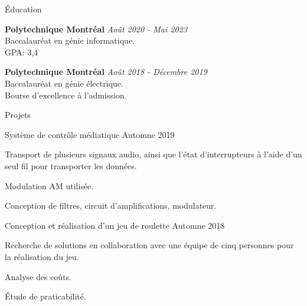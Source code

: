 \documentclass[french,12pt]{resume} %
\begin{document}
	
	
	\begin{rSection}{Éducation}
		
		{\bf Polytechnique Montréal} \hfill {\em Août 2020 - Mai 2023} 
		\\ Baccalauréat en génie informatique.
		\\GPA: 3,4
		
		
		{\bf Polytechnique Montréal} \hfill {\em Août 2018 - Décembre 2019} 
		\\ Baccalauréat en génie électrique.
		\\ \hspace{0.5cm}  Bourse d'excellence à l'admission.
		
	\end{rSection}
	
	
	\begin{rSection}{Projets}
		
		\begin{rSubsection}{Système de contrôle médiatique }{Automne 2019}{}{}
			\item   Transport de plusieurs signaux audio, ainsi que l'état d'interrupteurs à l'aide d'un seul fil pour transporter les données.
			\item   Modulation AM utilisée.
			\item Conception de filtres, circuit d'amplifications, modulateur.
			
		\end{rSubsection}

		
		\begin{rSubsection}{Conception et réalisation d’un jeu de roulette }{Automne 2018}{}{}
			\item  Recherche de solutions en collaboration avec une équipe de cinq personnes pour la réalisation du jeu.
			\item  Analyse des coûts.
			\item  Étude de praticabilité.
		\end{rSubsection} 
		
	\end{rSection}
	
\end{document}

